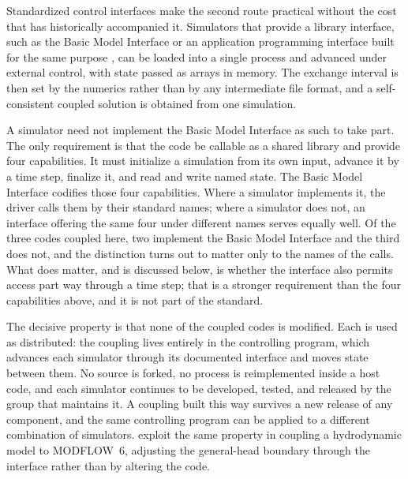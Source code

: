 \documentclass[preprint,authoryear,11pt]{elsarticle}
\begin{document}
Standardized control interfaces make the second route practical without the cost that has historically accompanied it. Simulators that provide a library interface, such as the Basic Model Interface \citep{hutton2020bmi} or an application programming interface built for the same purpose \citep{hughes2022modflowapi}, can be loaded into a single process and advanced under external control, with state passed as arrays in memory. The exchange interval is then set by the numerics rather than by any intermediate file format, and a self-consistent coupled solution is obtained from one simulation.

A simulator need not implement the Basic Model Interface as such to take part. The only requirement is that the code be callable as a shared library and provide four capabilities. It must initialize a simulation from its own input, advance it by a time step, finalize it, and read and write named state. The Basic Model Interface codifies those four capabilities. Where a simulator implements it, the driver calls them by their standard names; where a simulator does not, an interface offering the same four under different names serves equally well. Of the three codes coupled here, two implement the Basic Model Interface and the third does not, and the distinction turns out to matter only to the names of the calls. What does matter, and is discussed below, is whether the interface also permits access part way through a time step; that is a stronger requirement than the four capabilities above, and it is not part of the standard.

The decisive property is that none of the coupled codes is modified. Each is used as distributed: the coupling lives entirely in the controlling program, which advances each simulator through its documented interface and moves state between them. No source is forked, no process is reimplemented inside a host code, and each simulator continues to be developed, tested, and released by the group that maintains it. A coupling built this way survives a new release of any component, and the same controlling program can be applied to a different combination of simulators. \cite{jin2025gwocean} exploit the same property in coupling a hydrodynamic model to MODFLOW~6, adjusting the general-head boundary through the interface rather than by altering the code.
\end{document}
